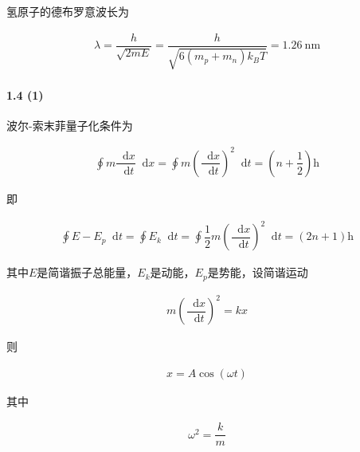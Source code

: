\documentclass{article}
\newcommand*{\md}{\mathop{}\!\mathrm{d}}
\newcommand*{\mh}{\mathrm{h}}
\newcommand{\si}[1]{\  \mathrm{#1}}
\begin{document}
氢原子的德布罗意波长为

\begin{equation*}
  \begin{aligned}
    \lambda = \dfrac{h}{\sqrt{2 m E}} = \dfrac{h}{\sqrt{6 \left( m_p + m_n \right) k_B T}} = 1.26 \si{nm}  
  \end{aligned}
\end{equation*}

\paragraph{1.4 (1)}

波尔-索末菲量子化条件为

\begin{equation*}
  \begin{aligned}
    \oint m \dfrac{\md x}{\md t} \md x = \oint m \left( \dfrac{\md x}{\md t}  \right)^2 \md t = \left( n + \dfrac{1}{2}  \right) \mh 
  \end{aligned}
\end{equation*}

即

\begin{equation*}
  \begin{aligned}
    \oint E - E_p \md t = \oint E_k \md t = \oint \dfrac{1}{2} m \left( \dfrac{\md x}{\md t}  \right)^2 \md t = \left( 2 n + 1  \right) \mh  
  \end{aligned}
\end{equation*}

其中$E$是简谐振子总能量，$E_k$是动能，$E_p$是势能，设简谐运动

\begin{equation*}
  \begin{aligned}
    m \left( \dfrac{\md x}{\md t}  \right)^2 = k x
  \end{aligned}
\end{equation*}

则

\begin{equation*}
  \begin{aligned}
    x = A \cos \left( \omega t \right)
  \end{aligned}
\end{equation*}

其中

\begin{equation*}
  \begin{aligned}
    \omega^2 = \dfrac{k}{m}
  \end{aligned}
\end{equation*}
\end{document}
